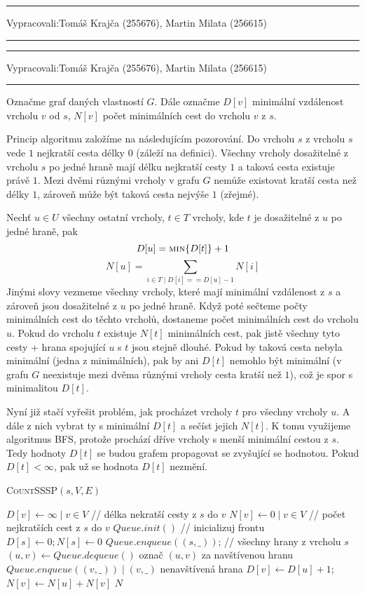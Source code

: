 \documentclass[12pt]{article}
\newcommand{\la}{\leftarrow}
\newcommand{\zadani}[2]{
{\large
\noindent {\bf IB108 \hfill{} Sada #1, Příklad #2 \\[-4mm]}
\noindent\hrule
\vspace{2mm}
\noindent Vypracovali:\hfill{}Tomáš Krajča (255676), Martin Milata (256615)
\vspace{3mm}
\hrule
\bigskip\bigskip}
}
\begin{document}
\zadani{3}{1}

\clearpage
\zadani{3}{2}

\noindent
Označme graf daných vlastností $G$. Dále označme $D[v]$ minimální vzdálenost vrcholu $v$
od $s$, $N[v]$ počet minimálních cest do vrcholu $v$ z $s$. 

\noindent
Princip algoritmu založíme na následujícím pozorování. Do vrcholu $s$ z vrcholu
$s$ vede $1$ nejkratší 
cesta délky $0$ (záleží na definici). Všechny vrcholy 
dosažitelné z vrcholu $s$ po jedné hraně mají délku nejkratší cesty $1$ a taková
cesta existuje právě $1$. Mezi dvěmi různými vrcholy v grafu $G$ nemůže existovat
kratší cesta než délky $1$, zároveň může být taková cesta nejvýše $1$ (zřejmé).

\noindent
Nechť $u \in U$ všechny ostatní vrcholy, 
 $t \in T$ vrcholy, kde $t$ je dosažitelné z $u$ po jedné hraně, pak
$$ D[u] = \textsc{min}\{D[t]\}+1$$
$$ N[u] = \sum_{i \in T \mid D[i] == D[u]-1} N[i]$$
Jinými slovy vezmeme všechny vrcholy, které mají minimální vzdálenost z $s$ a
zároveň jsou dosažitelné z $u$ po jedné hraně. Když poté sečteme počty
minimálních cest do těchto vrcholů, dostaneme počet minimálních cest do vrcholu
$u$. Pokud do vrcholu $t$ existuje $N[t]$ minimálních cest, pak jistě všechny
tyto cesty + hrana spojující $u$ s $t$ jsou stejně dlouhé. Pokud by taková cesta
nebyla minimální (jedna z minimálních), pak by ani $D[t]$ nemohlo být minimální
(v grafu $G$ neexistuje mezi dvěma různými vrcholy cesta kratší než $1$), což je
spor s minimalitou $D[t]$.

\noindent
Nyní již stačí vyřešit problém, jak procházet vrcholy $t$ pro všechny vrcholy
$u$. A dále z nich vybrat ty s minimální $D[t]$ a sečíst jejich $N[t]$. K tomu
využijeme algoritmus \textsc{BFS}, protože prochází dříve vrcholy s menší
minimální cestou z $s$. Tedy hodnoty $D[t]$ se budou grafem propagovat se
zvyšující se hodnotou. Pokud $D[t] < \infty$, pak už se hodnota $D[t]$ nezmění.

\begin{algorithm}
\textsc{CountSSSP}$(s, V, E)$
\begin{algorithmic}[1]
\STATE $D[v] \la \infty \mid v \in V$ // délka nekratší cesty z $s$ do $v$
\STATE $N[v] \la 0 \mid v \in V$ // počet nejkratších cest z $s$ do $v$
\STATE $Queue.init()$ // inicializuj frontu
\STATE $D[s] \la 0; N[s] \la 0$
\STATE $Queue.enqueue((s,\_))$; // všechny hrany z vrcholu $s$
\STATE $(u,v) \la Queue.dequeue()$
\STATE označ $(u,v)$ za navštívenou hranu
\STATE $Queue.enqueue((v,\_)) \mid (v,\_)$ nenavštívená hrana
\STATE $D[v] \la D[u]+1$; $N[v] \la N[u] + N[v]$
\ENDIF
\ENDWHILE
\RETURN $N$
\end{algorithmic}
\end{algorithm}
\end{document}
